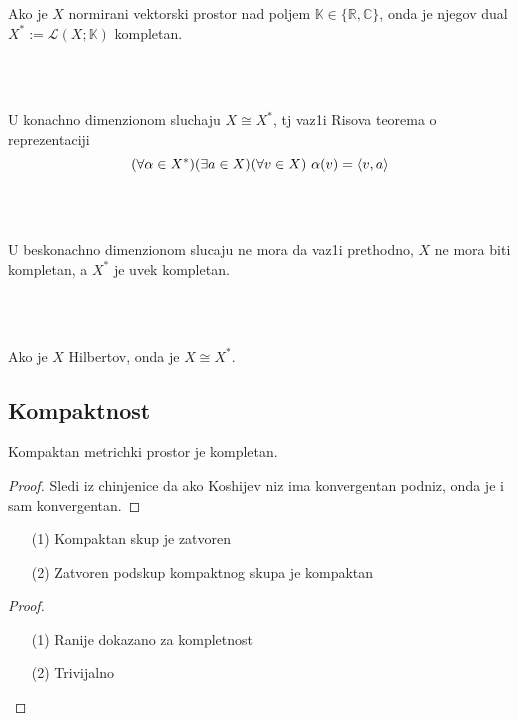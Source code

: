 \documentclass[a4paper,12pt]{article}
\newcommand{\RR}{\mathbb{R}}
\newcommand{\CC}{\mathbb{C}}
\begin{document}
\begin{nap} Ako je $X$ normirani vektorski prostor nad poljem $\mathbb{K} \in \{\RR, \CC \}$, onda je njegov dual $X^* := \mathcal{L} (X; \mathbb{K})$ kompletan.
\end{nap}
\\ \\
\begin{nap}
U konachno dimenzionom sluchaju $X \cong X^*$, tj vaz1i Risova teorema o re\-pre\-zen\-ta\-ci\-ji
\[(\forall \alpha \in X^*) (\exists a \in X) (\forall v \in X) \hspace{0.12cm} \alpha(v) = \langle v, a \rangle \]
\end{nap}
\\ \\
\begin{nap}
U beskonachno dimenzionom slucaju ne mora da vaz1i prethodno, $X$ ne mora biti kompletan, a $X^*$ je uvek kompletan.
\end{nap}
\\ \\
\begin{nap}
Ako je $X$ Hilbertov, onda je $X \cong X^*$.
\end{nap}

\subsection{Kompaktnost}

\begin{tvr}
Kompaktan metrichki prostor je kompletan.
\end{tvr}
\begin{proof}
Sledi iz chinjenice da ako Koshijev niz ima konvergentan podniz, onda je i sam konvergentan.
\end{proof}

\begin{tvr}
\begin{itemize}
\item[(1)] Kompaktan skup je zatvoren
\item[(2)] Zatvoren podskup kompaktnog skupa je kompaktan
\end{itemize}
\end{tvr}
\begin{proof}
\begin{itemize}
\item[(1)] Ranije dokazano za kompletnost
\item[(2)] Trivijalno
\end{itemize}
\end{proof}
\end{document}
